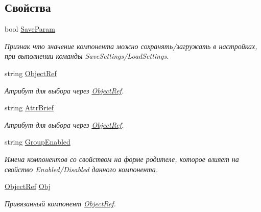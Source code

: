 \subsection*{Свойства}
\begin{DoxyCompactItemize}
\item 
bool \mbox{\hyperlink{class_f_b_a_1_1_button_f_b_a_a6cb2000b6e50e5eed0f7dea8e9d2f867}{Save\+Param}}
\begin{DoxyCompactList}\small\item\em Признак что значение компонента можно сохранять/загружать в настройках, при выполнении команды Save\+Settings/\+Load\+Settings. ~\newline
\end{DoxyCompactList}\item 
string \mbox{\hyperlink{class_f_b_a_1_1_button_f_b_a_a09d51acbcf79fa8696033f71a73332c8}{Object\+Ref}}
\begin{DoxyCompactList}\small\item\em Атрибут для выбора через \mbox{\hyperlink{class_f_b_a_1_1_object_ref}{Object\+Ref}}. ~\newline
\end{DoxyCompactList}\item 
string \mbox{\hyperlink{class_f_b_a_1_1_button_f_b_a_a2d52aeeec4a7287c1b1f7d38b81cadef}{Attr\+Brief}}
\begin{DoxyCompactList}\small\item\em Атрибут для выбора через \mbox{\hyperlink{class_f_b_a_1_1_object_ref}{Object\+Ref}}. ~\newline
\end{DoxyCompactList}\item 
string \mbox{\hyperlink{class_f_b_a_1_1_button_f_b_a_af65d7e3f07778e5c9c790ea109f264b9}{Group\+Enabled}}
\begin{DoxyCompactList}\small\item\em Имена компонентов со свойством на форме родителе, которое влияет на свойство Enabled/\+Disabled данного компонента. ~\newline
\end{DoxyCompactList}\item 
\mbox{\hyperlink{class_f_b_a_1_1_object_ref}{Object\+Ref}} \mbox{\hyperlink{class_f_b_a_1_1_button_f_b_a_a9e0dc338ce76e2aa933cf8ddae7486b8}{Obj}}
\begin{DoxyCompactList}\small\item\em Привязанный компонент \mbox{\hyperlink{class_f_b_a_1_1_object_ref}{Object\+Ref}}. \end{DoxyCompactList}\end{DoxyCompactItemize}


